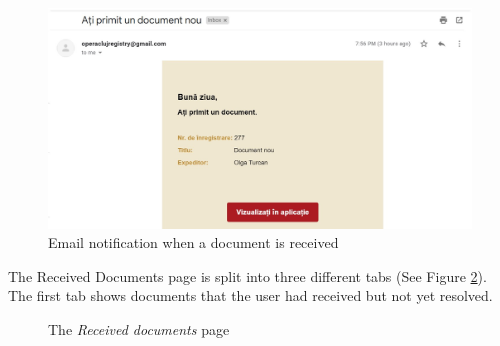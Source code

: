 \begin{figure}[H]
    \centering
    \includegraphics[width=5.5in]{images/app/document_received_mail}
    \caption{Email notification when a document is received}
    \label{receivedEmail}
\end{figure}

The Received Documents page is split into three different tabs (See Figure \ref{receivedDocs}). The first tab shows documents that the user had received but not yet resolved.

\begin{figure}[ht]
    \centering
    \qquad
    \caption{The \textit{Received documents} page}
    \label{receivedDocs}
\end{figure}

